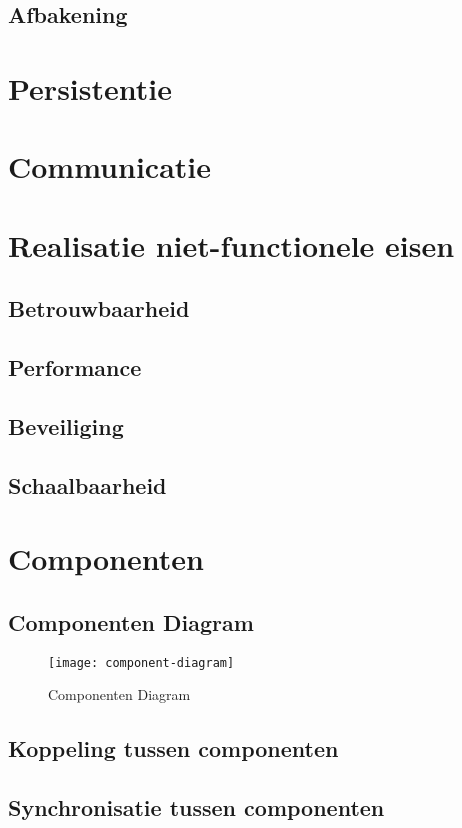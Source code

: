 \documentclass{scrreprt}
\begin{document}
	\section{Afbakening}
	
	\newpage
	\chapter{Persistentie}
	
	
	\newpage
	\chapter{Communicatie}
	
	\newpage
	\chapter{Realisatie niet-functionele eisen}
	\section{Betrouwbaarheid}
	\section{Performance}
	\section{Beveiliging}
	\section{Schaalbaarheid}
	
	\newpage
	\chapter{Componenten}
	\section{Componenten Diagram}
	\begin{figure}[ht]
		\centering
		\texttt{[image: component-diagram]}
		\label{pic:component-diagram}
		\caption{Componenten Diagram}
	\end{figure}
	\section{Koppeling tussen componenten}
	\section{Synchronisatie tussen componenten}
\end{document}

